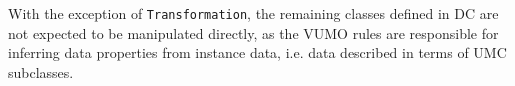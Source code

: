 \documentclass[]{interact}
\theoremstyle{plain}%
\theoremstyle{definition}
\theoremstyle{remark}
\theoremstyle{definition}
\begin{document}
With the exception of \texttt{Transformation}, the remaining classes defined in DC are not expected to be manipulated directly, as the VUMO rules are responsible for inferring data properties from instance data, i.e. data described in terms of UMC subclasses.






%
\end{document}
